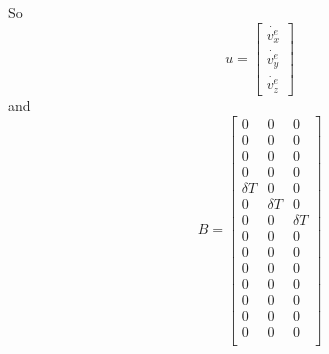 \documentclass[a4paper]{report}
\numberwithin{equation}{chapter}
\begin{document}
So
\begin{equation}
u =
\begin{bmatrix}
\dot{v^e_x}\\
\dot{v^e_y}\\
\dot{v^e_z}
\end{bmatrix}
\end{equation}
and
\begin{equation}
B =
\begin{bmatrix}
0 & 0 & 0\\
0 & 0 & 0\\
0 & 0 & 0\\
0 & 0 & 0\\
\delta T & 0 & 0\\
0 & \delta T & 0\\
0 & 0 & \delta T\\
0 & 0 & 0\\
0 & 0 & 0\\
0 & 0 & 0\\
0 & 0 & 0\\
0 & 0 & 0\\
0 & 0 & 0\\
0 & 0 & 0\\
\end{bmatrix}
\end{equation}

\bigskip
\end{document}
